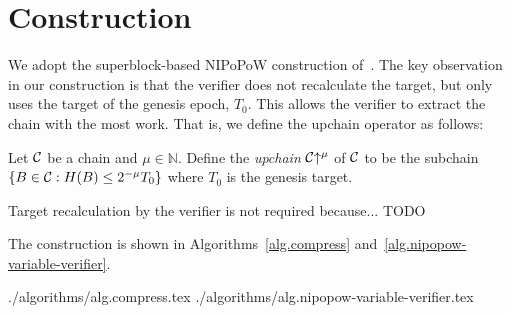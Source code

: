 \section{Construction}

We adopt the superblock-based NIPoPoW construction of~\cite{logspace}. The key
observation in our construction is that the verifier does not recalculate the
target, but only uses the target of the genesis epoch, $T_0$. This allows the
verifier to extract the chain with the most work. That is, we define the upchain operator as follows:

\begin{definition}[Upchain]
  Let $\mathcal{C}$ be a chain and $\mu \in \mathbb{N}$.
  Define the \emph{upchain} $\mathcal{C}\negthickspace\uparrow^\mu$ of $\mathcal{C}$ to be the
  subchain $\{B \in \mathcal{C}: H(B) \leq 2^{-\mu} T_0\}$ where
  $T_0$ is the genesis target.
\end{definition}

Target recalculation by the verifier is not required because... TODO

The construction is shown in Algorithms~\ref{alg.compress}
and~\ref{alg.nipopow-variable-verifier}.

{./algorithms/alg.compress.tex}
{./algorithms/alg.nipopow-variable-verifier.tex}
